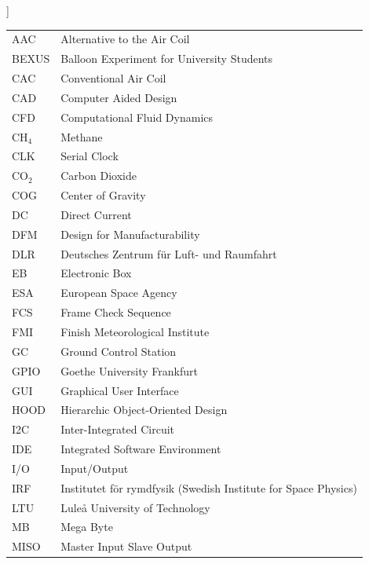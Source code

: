 ]\documentclass[a4paper,12pt,twoside]{article}
\begin{document}
  
    \begin{longtable}{p{3cm} p{9cm}}
            AAC         & Alternative to the Air Coil\\
            BEXUS       & Balloon Experiment for University Students\\
            CAC         & Conventional Air Coil\\
            CAD         & Computer Aided Design \\
            CFD         & Computational Fluid Dynamics\\
            CH$_{4}$    & Methane\\
            CLK         & Serial Clock\\
            CO$_{2}$    & Carbon Dioxide\\
            COG         & Center of Gravity \\
            DC          & Direct Current\\
            DFM         & Design for Manufacturability \\
            DLR         & Deutsches Zentrum f{\"u}r Luft- und Raumfahrt \\
            EB          & Electronic Box \\
            ESA         & European Space Agency \\
            FCS         & Frame Check Sequence\\
            FMI         & Finish Meteorological Institute\\
            GC          & Ground Control Station\\
            GPIO        & Goethe University Frankfurt\\
            GUI         & Graphical User Interface\\
            HOOD        & Hierarchic Object-Oriented Design\\
            I2C         & Inter-Integrated Circuit \\
            IDE         & Integrated Software Environment \\
            I/O         & Input/Output\\
            IRF         & Institutet för rymdfysik (Swedish Institute for Space Physics)\\
            LTU         & Luleå University of Technology \\
            MB          & Mega Byte\\
            MISO        & Master Input Slave Output\\

\end{longtable}
\end{document}
